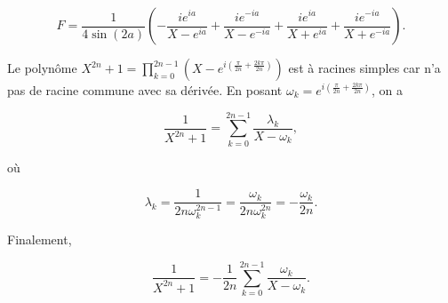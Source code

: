 {{\begin{itemize}
$$F=\frac{1}{4\sin(2a)}(-\frac{ie^{ia}}{X-e^{ia}}+\frac{ie^{-ia}}{X-e^{-ia}}+\frac{ie^{ia}}{X+e^{ia}}+\frac{ie^{-ia}}{X+e^{-ia}}).$$

\end{itemize}
Le polynôme $X^{2n}+1=\prod_{k=0}^{2n-1}(X-e^{i(\frac{\pi}{2n}+\frac{2k\pi}{2n})})$ est à racines simples car n'a pas de racine commune avec sa dérivée. En posant $\omega_k=e^{i(\frac{\pi}{2n}+\frac{2k\pi}{2n})}$, on a

$$\frac{1}{X^{2n}+1}=\sum_{k=0}^{2n-1}\frac{\lambda_k}{X-\omega_k},$$

où 

$$\lambda_k=\frac{1}{2n\omega_k^{2n-1}}=\frac{\omega_k}{2n\omega_k^{2n}}=-\frac{\omega_k}{2n}.$$

Finalement,

$$\frac{1}{X^{2n}+1}=-\frac{1}{2n}\sum_{k=0}^{2n-1}\frac{\omega_k}{X-\omega_k}.$$
}
}
